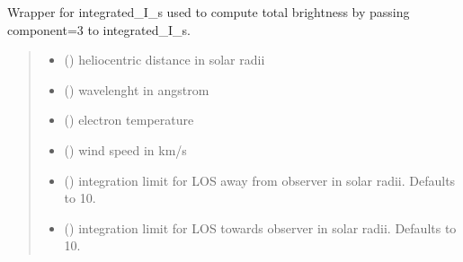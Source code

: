 \documentclass[letterpaper,10pt,english]{sphinxmanual}
\begin{document}

\begin{fulllineitems}
\label{\detokenize{doppler_dimming_lib:doppler_dimming_lib.integrals.I_s_lambda}}
\pysigstartsignatures
{}
\pysigstopsignatures
\sphinxAtStartPar
Wrapper for integrated\_I\_s used to compute total brightness by passing component=3 to integrated\_I\_s.
\begin{quote}\begin{description}
\begin{itemize}
\item {} 
\sphinxAtStartPar
{} () \textendash{} heliocentric distance in solar radii

\item {} 
\sphinxAtStartPar
{} () \textendash{} wavelenght in angstrom

\item {} 
\sphinxAtStartPar
{} () \textendash{} electron temperature

\item {} 
\sphinxAtStartPar
{} () \textendash{} wind speed in km/s

\item {} 
\sphinxAtStartPar
{} (\sphinxstyleliteralemphasis{\sphinxupquote{, }}) \textendash{} integration limit for LOS away from observer in solar radii. Defaults to 10.

\item {} 
\sphinxAtStartPar
{} (\sphinxstyleliteralemphasis{\sphinxupquote{, }}) \textendash{} integration limit for LOS towards observer in solar radii. Defaults to 10.


\end{itemize}
\end{description}
\end{quote}
\end{fulllineitems}
\end{document}
